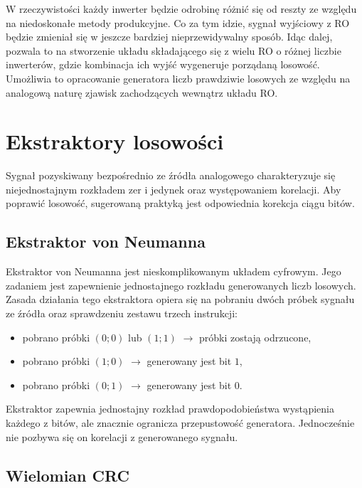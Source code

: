 W rzeczywistości każdy inwerter będzie odrobinę różnić się od reszty ze 
względu na niedoskonałe metody produkcyjne. Co za tym idzie, sygnał wyjściowy 
z RO będzie zmieniał się w jeszcze bardziej nieprzewidywalny sposób. Idąc 
dalej, pozwala to na stworzenie układu składającego się z wielu RO o różnej liczbie inwerterów, 
gdzie kombinacja ich wyjść wygeneruje porządaną losowość. Umożliwia to 
opracowanie generatora liczb prawdziwie losowych ze względu na analogową 
naturę zjawisk zachodzących wewnątrz układu RO.

\section{Ekstraktory losowości}

\noindent Sygnał pozyskiwany bezpośrednio ze źródła analogowego charakteryzuje się 
niejednostajnym rozkładem zer i jedynek oraz występowaniem korelacji. Aby poprawić 
losowość, sugerowaną praktyką jest odpowiednia korekcja ciągu bitów. 

\subsection{Ekstraktor von Neumanna}

\noindent Ekstraktor von Neumanna jest nieskomplikowanym układem cyfrowym. 
Jego zadaniem jest zapewnienie jednostajnego rozkładu generowanych liczb losowych. 
Zasada działania tego ekstraktora opiera się na pobraniu dwóch próbek sygnału ze 
źródła oraz sprawdzeniu zestawu trzech instrukcji:

\begin{itemize}
    \item pobrano próbki $(0;0)$ lub $(1;1)$ $\rightarrow$ próbki zostają odrzucone,
    \item pobrano próbki $(1;0)$ $\rightarrow$ generowany jest bit $1$,
    \item pobrano próbki $(0;1)$ $\rightarrow$ generowany jest bit $0$.
\end{itemize}

Ekstraktor zapewnia jednostajny rozkład prawdopodobieństwa wystąpienia 
każdego z bitów, ale znacznie ogranicza przepustowość generatora. Jednocześnie 
nie pozbywa się on korelacji z generowanego sygnału. 

\subsection{Wielomian CRC}

